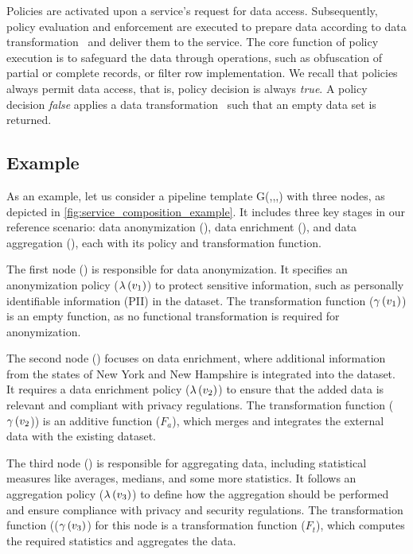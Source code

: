 Policies are activated upon a service's request for data access. Subsequently, policy evaluation and enforcement are executed to prepare data according to data transformation \TF\ and deliver them to the service. The core function of policy execution is to safeguard the data through operations, such as obfuscation of partial or complete records, or filter row implementation. We recall that policies always permit data access, that is, policy decision is always \emph{true}. A policy decision \emph{false} applies a data transformation \TF\ such that an empty data set is returned.

\subsection{Example}\label{sec:example}
As an example, let us consider a pipeline template G(\V,\E,\myLambda,\myGamma) with three nodes, as depicted in \cref{fig:service_composition_example}.
It includes three key stages in our reference scenario: data anonymization (), data enrichment (), and data aggregation (), each with its policy and transformation function.

The first node () is responsible for data anonymization. It specifies an anonymization policy ($\lambda\,(v_1)$) to protect sensitive information, such as personally identifiable information (PII) in the dataset. The transformation function ($\gamma\,(v_1)$) is an empty function, as no functional transformation is required for anonymization.

The second node () focuses on data enrichment, where additional information from the states of New York and New Hampshire is integrated into the dataset. It requires a data enrichment policy ($\lambda\,(v_2)$) to ensure that the added data is relevant and compliant with privacy regulations. The transformation function ($\gamma\,(v_2$)) is an additive function ($F_a$), which merges and integrates the external data with the existing dataset.

The third node () is responsible for aggregating data, including statistical measures like averages, medians, and some more statistics. It follows an aggregation policy ($\lambda\,(v_3)$) to define how the aggregation should be performed and ensure compliance with privacy and security regulations. The transformation function (($\gamma\,(v_3)$) for this node is a transformation function ($F_t$), which computes the required statistics and aggregates the data.

